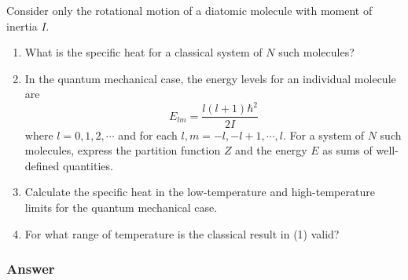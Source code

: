 Consider only the rotational motion of a diatomic molecule with moment of inertia $I$.
\begin{enumerate}
	\item What is the specific heat for a classical system of $N$ such molecules?
	\item In the quantum mechanical case, the energy levels for an individual molecule are
	\begin{equation*}
		E_{lm} = \frac{l(l+1)\hbar^2}{2I}
	\end{equation*}
	where $l = 0, 1, 2, \cdots$ and for each $l, m = -l, -l+1,\cdots, l$. For a system of $N$ such molecules, express the partition function $Z$ and the energy $E$ as sums of well-defined quantities.
	\item Calculate the specific heat in the low-temperature and high-temperature limits for the quantum mechanical case.
	\item For what range of temperature is the classical result in (1) valid?
\end{enumerate}

\subsubsection{Answer}

